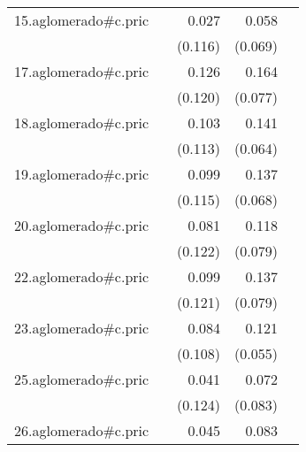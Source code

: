{\begin{longtable}{l*{4}{D{.}{.}{-1}}}
\addlinespace
15.aglomerado#c.pric&                     &       0.027         &       0.058         &                     \\
            &                     &     (0.116)         &     (0.069)         &                     \\
\addlinespace
17.aglomerado#c.pric&                     &       0.126         &       0.164\sym{*}  &                     \\
            &                     &     (0.120)         &     (0.077)         &                     \\
\addlinespace
18.aglomerado#c.pric&                     &       0.103         &       0.141\sym{*}  &                     \\
            &                     &     (0.113)         &     (0.064)         &                     \\
\addlinespace
19.aglomerado#c.pric&                     &       0.099         &       0.137\sym{*}  &                     \\
            &                     &     (0.115)         &     (0.068)         &                     \\
\addlinespace
20.aglomerado#c.pric&                     &       0.081         &       0.118         &                     \\
            &                     &     (0.122)         &     (0.079)         &                     \\
\addlinespace
22.aglomerado#c.pric&                     &       0.099         &       0.137         &                     \\
            &                     &     (0.121)         &     (0.079)         &                     \\
\addlinespace
23.aglomerado#c.pric&                     &       0.084         &       0.121\sym{*}  &                     \\
            &                     &     (0.108)         &     (0.055)         &                     \\
\addlinespace
25.aglomerado#c.pric&                     &       0.041         &       0.072         &                     \\
            &                     &     (0.124)         &     (0.083)         &                     \\
\addlinespace
26.aglomerado#c.pric&                     &       0.045         &       0.083         &                     \\

\end{longtable}}
